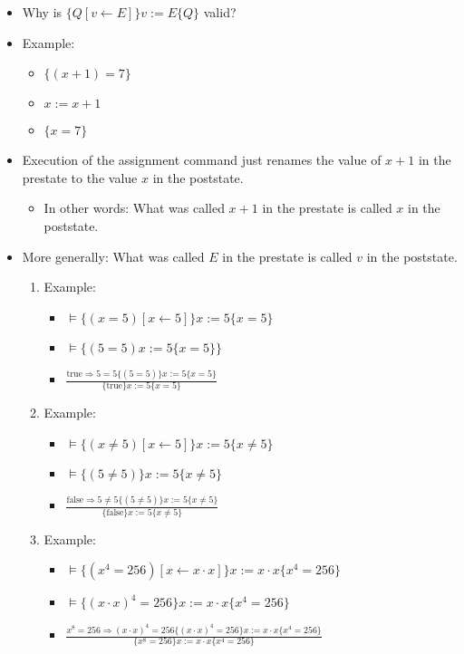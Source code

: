 \begin{multicols}{2}
\begin{itemize}
  \item Why is $\{Q[v \leftarrow E]\} v:=E\{Q\}$ valid?
  \item Example:
  \begin{itemize}
    \item [\-] $\{\left(x+1\right)=7\}$
    \item [\-] $x := x+1$
    \item [\-] $\{x=7\}$
  \end{itemize}
  \item Execution of the assignment command just renames the value of $x+1$ in the prestate to the value $x$ in the poststate.
  \begin{itemize}
    \item In other words: What was called $x+1$ in the prestate is called $x$ in the poststate.
  \end{itemize}
  \item More generally: What was called $E$ in the prestate is called $v$ in the poststate.
  \begin{enumerate}
    \item Example:
    \begin{itemize}
      \item [\-] $\models \{\left(x=5\right)[x \leftarrow 5]\} x := 5 \{x=5\}$
      \item [\-] $\models \{\left(5=5\right) x := 5 \{x=5\}\}$
      \item [\-] $\frac{\text{true} \Rightarrow 5=5 \{\left(5=5\right)\} x := 5 \{x=5\}}{\{\text{true}\} x := 5 \{x=5\}}$
    \end{itemize}
    \item Example:
    \begin{itemize}
      \item [\-] $\models \{\left(x\neq 5\right)[x \leftarrow 5]\} x := 5 \{x\neq 5\}$
      \item [\-] $\models \{\left(5\neq 5\right)\} x := 5 \{x\neq 5\}$
      \item [\-] $\frac{\text{false} \Rightarrow 5\neq 5 \{\left(5\neq 5\right)\} x := 5 \{x \neq 5\}}{\{\text{false}\} x := 5 \{x \neq 5\}}$
    \end{itemize}
    \item Example:
    \begin{itemize}
      \item [\-] $\models \{\left(x^4=256\right)[x \leftarrow x\cdot x]\} x := x \cdot x \{x^4 = 256\}$
      \item [\-] $\models \{\left(x \cdot x\right)^4=256\} x := x \cdot x \{x^4=256\}$
      \item [\-] $\frac{x^8=256 \Rightarrow \left(x \cdot x\right)^4=256 \{\left(x \cdot x\right)^4=256\} x := x \cdot x \{x^4=256\}}{\{x^8=256\} x := x \cdot x \{x^4=256\}}$
    \end{itemize}
  \end{enumerate}
\end{itemize}


\end{multicols}
